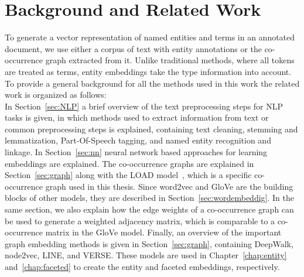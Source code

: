 
\chapter{Background and Related Work}\label{chap:background}
To generate a vector representation of named entities and terms in an annotated document, we use either a corpus of text with entity annotations or the co-occurrence graph extracted from it. Unlike traditional methods, where all tokens are treated as terms, entity embeddings take the type information into account. To provide a general background for all the methods used in this work the related work is organized as follows:\\
In Section~\ref{sec:NLP} a brief overview of the text preprocessing steps for NLP tasks is given, in which methods used to extract information from text or common preprocessing steps is explained, containing text cleaning, stemming and lemmatization, Part-Of-Speech tagging, and named entity recognition and linkage. In Section~\ref{sec:nn} neural network based approaches for learning embeddings are explained. The co-occurrence graphs are explained in Section~\ref{sec:graph} along with the LOAD model~, which is a specific co-occurrence graph used in this thesis. Since word2vec and GloVe are the building blocks of other models, they are described in Section~\ref{sec:wordembeddig}. In the same section, we also explain how the edge weights of a co-occurrence graph can be used to generate a weighted adjacency matrix, which is comparable to a co-occurrence matrix in the GloVe model.  Finally, an overview of the important graph embedding methods is given in Section~\ref{sec:graph}, containing DeepWalk, node2vec, LINE, and VERSE. These models are used  in Chapter~\ref{chap:entity} and~\ref{chap:faceted} to create the entity and faceted embeddings, respectively. 


